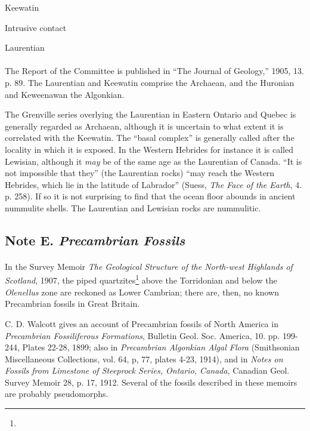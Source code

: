 \documentclass[a4paper, 12pt, oneside]{article}
\begin{document}
Keewatin

\hspace{10mm}Intrusive contact

Laurentian

\paragraph{}
The Report of the Committee is published in ``The Journal of Geology,'' 1905, 13. p. 89. The Laurentian and Keewatin comprise the Archaean, and the Huronian and Keweenawan the Algonkian.

The Grenville series overlying the Laurentian in Eastern Ontario and Quebec is generally regarded as Archaean, although it is uncertain to what extent it is correlated with the Keewatin. The ``basal complex'' is generally called after the locality in which it is exposed. In the Western Hebrides for instance it is called Lewisian, although it \emph{may} be of the same age as the Laurentian of Canada. ``It is not impossible that they'' (the Laurentian rocks) ``may reach the Western Hebrides, which lie in the latitude of Labrador'' (Suess, \emph{The Face of the Earth}, 4. p. 258). If so it is not surprising to find that the ocean floor abounds in ancient nummulite shells. The Laurentian and Lewisian rocks are nummulitic.

\subsection{Note E. \emph{Precambrian Fossils}}
\paragraph{}
In the Survey Memoir \emph{The Geological Structure of the North-west Highlands of Scotland}, 1907, the piped quartzites\footnote{} above the Torridonian and below the \emph{Olenellus} zone are reckoned as Lower Cambrian; there are, then, no known Precambrian fossils in Great Britain.

C. D. Walcott gives an account of Precambrian fossils of North America in \emph{Precambrian Fossiliferous Formations}, Bulletin Geol. Soc. America, 10. pp. 199-244, Plates 22-28, 1899; also in \emph{Precambrian Algonkian Algal Flora} (Smithsonian Miscellaneous Collections, vol. 64, p, 77, plates 4-23, 1914), and in \emph{Notes on Fossils from Limestone of Steeprock Series, Ontario, Canada}, Canadian Geol. Survey Memoir 28, p. 17, 1912. Several of the fossils described in these memoirs are probably pseudomorphs.
\end{document}

